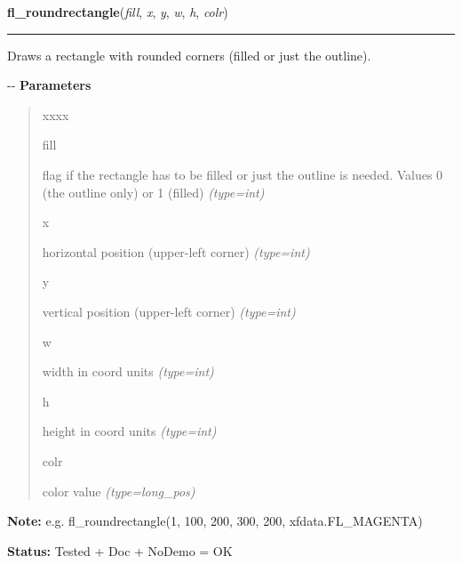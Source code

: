     \label{xformslib:flxbasic:fl_roundrectangle}

    \vspace{0.5ex}

\hspace{.8\funcindent}\begin{boxedminipage}{\funcwidth}

    \raggedright \textbf{fl\_roundrectangle}(\textit{fill}, \textit{x}, \textit{y}, \textit{w}, \textit{h}, \textit{colr})

    \vspace{-1.5ex}

    \rule{\textwidth}{0.5\fboxrule}
\setlength{\parskip}{2ex}

Draws a rectangle with rounded corners (filled or just the outline).

-{}-
\setlength{\parskip}{1ex}
      \textbf{Parameters}
      \vspace{-1ex}

      \begin{quote}
        \begin{Ventry}{xxxx}

          \item[fill]


flag if the rectangle has to be filled or just the outline is
needed. Values 0 (the outline only) or 1 (filled)
            {\it (type=int)}

          \item[x]


horizontal position (upper-left corner)
            {\it (type=int)}

          \item[y]


vertical position (upper-left corner)
            {\it (type=int)}

          \item[w]


width in coord units
            {\it (type=int)}

          \item[h]


height in coord units
            {\it (type=int)}

          \item[colr]


color value
            {\it (type=long\_pos)}

        \end{Ventry}

      \end{quote}

\textbf{Note:} 
e.g. fl\_roundrectangle(1, 100, 200, 300, 200, xfdata.FL\_MAGENTA)


\textbf{Status:} 
Tested + Doc + NoDemo = OK


    \end{boxedminipage}

